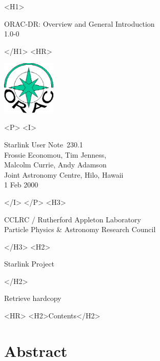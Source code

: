 \documentclass[twoside,11pt]{article}
\newcommand{\stardoccategory}  {Starlink User Note}
\newcommand{\stardocsource}    {sun\stardocnumber}
\newcommand{\stardocnumber}    {230.1}
\newcommand{\stardocauthors}   {Frossie Economou, Tim Jenness,\\ Malcolm Currie, Andy Adamson\\
Joint Astronomy Centre, Hilo, Hawaii}
\newcommand{\stardocdate}      {1 Feb 2000}
\newcommand{\stardoctitle}     {ORAC-DR: Overview and General Introduction}
\newcommand{\stardocversion}   {1.0-0}
\newcommand{\stardocmanual}    {}
\newcommand{\htmladdnormallink}[2]{#1}
\newcommand{\htmladdimg}[1]{}
\newcommand{\htmlref}[2]{#1}
\newcommand{\htmladdtonavigation}[1]{}
\newcommand{\xlabel}[1]{}
\renewcommand{\_}{\texttt{\symbol{95}}}
\begin{document}
\begin{htmlonly}
   \xlabel{}
   \begin{rawhtml} <H1> \end{rawhtml}
      \stardoctitle\\
      \stardocversion\\
      \stardocmanual
   \begin{rawhtml} </H1> <HR> \end{rawhtml}

\includegraphics[width=1.0in]{sun230_logo.eps}

   \begin{rawhtml} <P> <I> \end{rawhtml}
   \stardoccategory\ \stardocnumber \\
   \stardocauthors \\
   \stardocdate
   \begin{rawhtml} </I> </P> <H3> \end{rawhtml}
      \htmladdnormallink{CCLRC / Rutherford Appleton Laboratory}
                        {http://www.cclrc.ac.uk} \\
      \htmladdnormallink{Particle Physics \& Astronomy Research Council}
                        {http://www.pparc.ac.uk} \\
   \begin{rawhtml} </H3> <H2> \end{rawhtml}
      \htmladdnormallink{Starlink Project}{http://www.starlink.rl.ac.uk/}
   \begin{rawhtml} </H2> \end{rawhtml}
   \htmladdnormallink{\htmladdimg{source.gif} Retrieve hardcopy}
      {http://www.starlink.rl.ac.uk/cgi-bin/hcserver?\stardocsource}\\

  \label{stardoccontents}
  \begin{rawhtml} 
    <HR>
    <H2>Contents</H2>
  \end{rawhtml}
  \htmladdtonavigation{\htmlref{\htmladdimg{contents_motif.gif}}
        {stardoccontents}}

  \section{\xlabel{abstract}Abstract}
\end{htmlonly}
\end{document}
